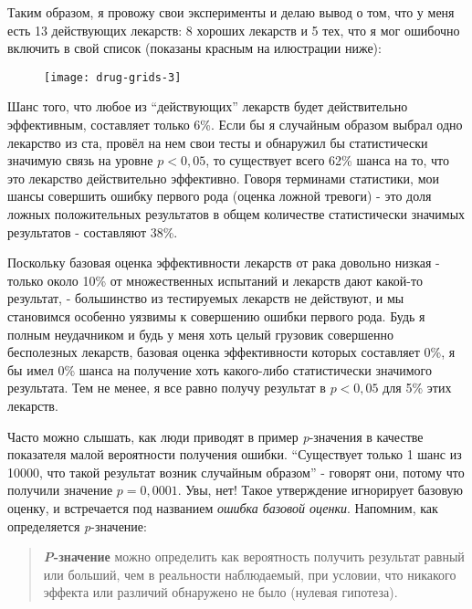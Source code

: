 Таким образом, я провожу свои эксперименты и делаю вывод о том, что у меня есть 13 действующих лекарств: 8 хороших лекарств и 5 тех, что я мог ошибочно включить в свой список (показаны красным на илюстрации ниже):



\begin{figure}[h!]
    \centering
    \texttt{[image: drug-grids-3]}
    \label{fig5:drug-grid-3}
\end{figure}

Шанс того, что любое из ``действующих'' лекарств будет действительно эффективным, составляет только 6\%. Если бы я случайным образом выбрал одно лекарство из ста, провёл на нем свои тесты и обнаружил бы статистически значимую связь на уровне $p<0,05$, то существует всего 62\% шанса на то, что это лекарство действительно эффективно. Говоря терминами статистики, мои шансы совершить ошибку первого рода (оценка ложной тревоги) - это доля ложных положительных результатов в общем количестве статистически значимых результатов - составляют 38\%.  

Поскольку базовая оценка эффективности лекарств от рака довольно низкая - только около 10\% от множественных испытаний и лекарств дают какой-то результат, - большинство из тестируемых лекарств не действуют, и мы становимся особенно уязвимы к совершению ошибки первого рода. Будь я полным неудачником и будь у меня хоть целый грузовик совершенно бесполезных лекарств, базовая оценка эффективности которых составляет 0\%, я бы имел 0\% шанса на получение хоть какого-либо статистически значимого результата. Тем не менее, я все равно получу результат в $p<0,05$ для 5\% этих лекарств.

Часто можно слышать, как люди приводят в пример \emph{p}-значения в качестве показателя малой вероятности получения ошибки. ``Существует только 1 шанс из 10000, что такой результат возник случайным образом'' - говорят они, потому что получили значение $p=0,0001$. Увы, нет! Такое утверждение игнорирует базовую оценку, и встречается под названием \emph{ошибка базовой оценки}. Напомним, как определяется \emph{p}-значение:

\begin{quotation}

\textbf{\emph{P}-значение} можно определить как вероятность получить результат равный или больший, чем в реальности наблюдаемый, при условии, что никакого эффекта или различий обнаружено не было (нулевая гипотеза).   

\end{quotation}


